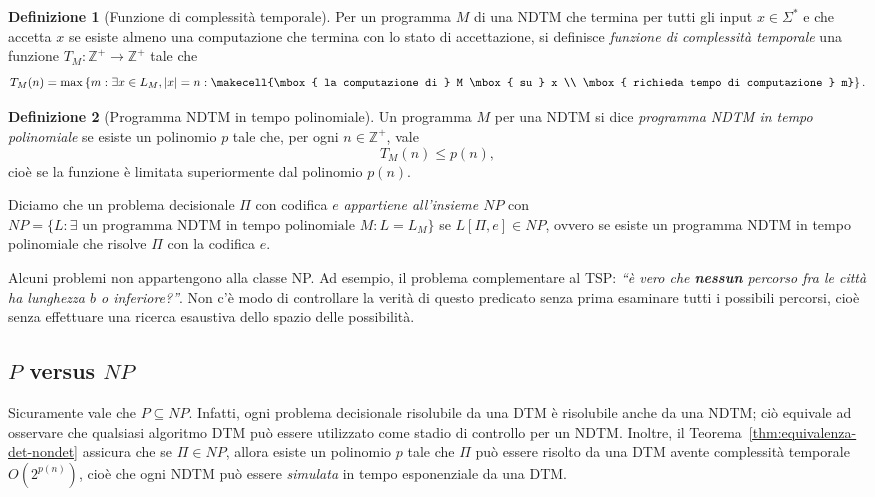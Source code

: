 \documentclass[10pt]{\classname}
\theoremstyle{newlinethm}
\theoremstyle{theorem}
\theoremstyle{definition}
\newtheorem{definizione}{Definizione}[section]
\theoremstyle{definition}
\theoremstyle{definition}
\theoremstyle{definition}
\begin{document}
\begin{definizione}[Funzione di complessità temporale]
    Per un programma $M$ di una NDTM che termina per tutti gli input $x \in \Sigma^*$ e che accetta $x$ se esiste almeno una computazione che termina con lo stato di accettazione, si definisce \emph{funzione di complessità temporale} una funzione $T_M : \mathbb Z^+ \rightarrow \mathbb Z^+$ tale che \[T_M(n) = \max \left\{m : \exists x \in L_M, |x| = n :\makecell{\mbox{ la computazione di } M \mbox{ su } x \\ \mbox{ richieda tempo di computazione } m}\right\}.\]
\end{definizione}

\begin{definizione}[Programma NDTM in tempo polinomiale]
    Un programma $M$ per una NDTM si dice \emph{programma NDTM in tempo polinomiale} se esiste un polinomio $p$ tale che, per ogni $n \in \mathbb Z^+$, vale \[T_M(n) \leq p(n),\] cioè se la funzione è limitata superiormente dal polinomio $p(n)$.

    Diciamo che un problema decisionale $\Pi$ con codifica $e$ \emph{appartiene all'insieme $NP$} con $NP = \{L : \exists \mbox{ un programma NDTM in tempo polinomiale } M : L=L_M\}$ se $L[\Pi, e] \in NP$, ovvero se esiste un programma NDTM in tempo polinomiale che risolve $\Pi$ con la codifica $e$.
\end{definizione}

Alcuni problemi non appartengono alla classe NP. Ad esempio, il problema complementare al TSP: \emph{``è vero che \textbf{nessun} percorso fra le città ha lunghezza $b$ o inferiore?''}. Non c'è modo di controllare la verità di questo predicato senza prima esaminare tutti i possibili percorsi, cioè senza effettuare una ricerca esaustiva dello spazio delle possibilità.

\subsection{$P$ versus $NP$}

Sicuramente vale che $P \subseteq NP$. Infatti, ogni problema decisionale risolubile da una DTM è risolubile anche da una NDTM; ciò equivale ad osservare che qualsiasi algoritmo DTM può essere utilizzato come stadio di controllo per un NDTM. Inoltre, il Teorema~\ref{thm:equivalenza-det-nondet} assicura che se $\Pi \in NP$, allora esiste un polinomio $p$ tale che $\Pi$ può essere risolto da una DTM avente complessità temporale $O(2^{p(n)})$, cioè che ogni NDTM può essere \emph{simulata} in tempo esponenziale da una DTM.
\end{document}
